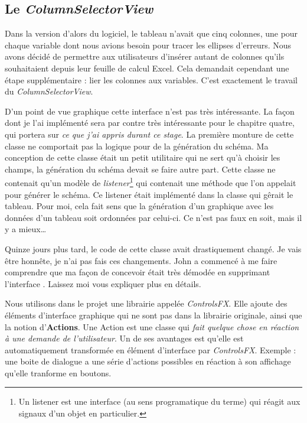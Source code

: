 %
%
\subsection{Le \textit{ColumnSelectorView}}
Dans la version d'alors du logiciel, le tableau n'avait que cinq colonnes, une pour chaque variable dont nous avions besoin pour tracer les ellipses d'erreurs. Nous avons décidé de permettre aux utilisateurs d'insérer autant de colonnes qu'ils souhaitaient depuis leur feuille de calcul Excel. Cela demandait cependant une étape supplémentaire : lier les colonnes aux variables. C'est exactement le travail du \textit{ColumnSelectorView}. 


D'un point de vue graphique cette interface n'est pas très intéressante. La façon dont je l'ai implémenté sera par contre très intéressante pour le chapitre quatre, qui portera sur \textit{ce que j'ai appris durant ce stage}. La première monture de cette classe ne comportait pas la logique pour de la génération du schéma. Ma conception de cette classe était un petit utilitaire qui ne sert qu'à choisir les champs, la génération du schéma devait se faire autre part. Cette classe ne contenait qu'un modèle de \textit{listener}\footnote{Un listener est une interface (au sens programatique du terme) qui réagit aux signaux d'un objet en particulier.} qui contenait une méthode que l'on appelait pour générer le schéma. Ce listener était implémenté dans la classe qui gêrait le tableau. Pour moi, cela fait sens que la génération d'un graphique avec les données d'un tableau soit ordonnées par celui-ci. Ce n'est pas faux en soit, mais il y a mieux\ldots


Quinze jours plus tard, le code de cette classe avait drastiquement changé. Je vais être honnête, je n'ai pas fais ces changements. John a commencé à me faire comprendre que ma façon de concevoir était très démodée en supprimant l'interface %
. Laissez moi vous expliquer plus en détails.

Nous utilisons dans le projet une librairie appelée \textit{ControlsFX}. Elle ajoute des éléments d'interface graphique qui ne sont pas dans la librairie originale, ainsi que la notion d'\textbf{Actions}. Une Action est une classe qui \textit{fait quelque chose en réaction à une demande de l'utilisateur}. Un de ses avantages est qu'elle est automatiquement transformée en élément d'interface par \textit{ControlsFX}. Exemple : une boite de dialogue a une série d'actions possibles en réaction à son affichage qu'elle tranforme en boutons.

